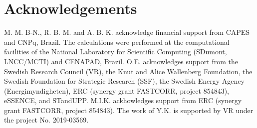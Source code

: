 \documentclass[prl,final,twocolumn]{revtex4-1}
\begin{document}
\section*{Acknowledgements}
M. M. B-N., R. B. M. and A. B. K. acknowledge financial support from CAPES and CNPq, Brazil. 
The calculations were performed at the computational facilities of the National Laboratory for Scientific Computing (SDumont, LNCC/MCTI) and CENAPAD, Brazil. 
O.E. acknowledges support from the Swedish Research Council (VR), the Knut and Alice Wallenberg Foundation, the Swedish Foundation for Strategic Research (SSF), the Swedish Energy Agency (Energimyndigheten), ERC (synergy grant FASTCORR, project 854843), eSSENCE, and STandUPP. M.I.K. ackhowledges support from ERC (synergy grant FASTCORR, project 854843). The work of Y.K. is supported by VR under the project No. 2019-03569.



  



%
%
\end{document}
